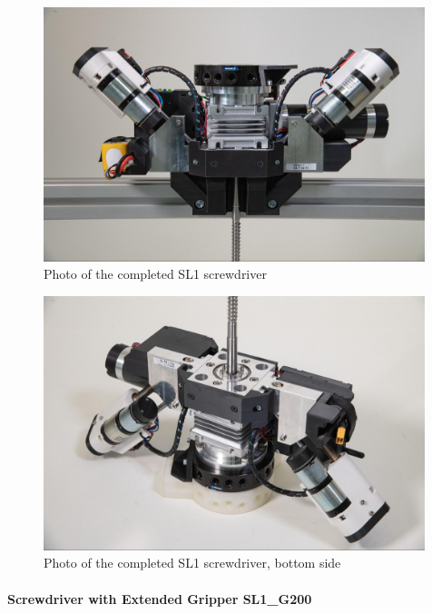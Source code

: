 \begin{figure}[!p]
    \centering
    \includegraphics[width=0.99\textwidth]{images/7a/img54.jpg}
    \caption{Photo of the completed SL1 screwdriver}
    \label{fig:completed-sl1-screwdriver}
\end{figure}

\begin{figure}[!p]
    \centering
    \includegraphics[width=0.99\textwidth]{images/7a/img55.jpg}
    \caption{Photo of the completed SL1 screwdriver, bottom side}
    \label{fig:sl1-screwdriver-bottom-side}
\end{figure}

\paragraph{Screwdriver with Extended Gripper SL1\_G200}

